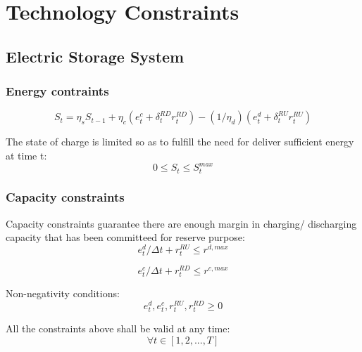 \section{Technology Constraints}

\subsection{Electric Storage System}
\subsubsection{Energy contraints}

\begin{equation}
\label{eq:state-ess}
S_t = \eta_s S_{t-1} + \eta_c (e_t^c+\delta^{RD}_t r^{RD}_t)  - (1/\eta_d) (e_t^d+\delta^{RU}_t r^{RU}_t)
\end{equation}

The state of charge is limited so as to fulfill the need for deliver sufficient energy at time t:
\begin{equation}
\label{eq:limit-state}
0 \leq S_t \leq S_t^{max} %
\end{equation}

\subsubsection{Capacity constraints}

Capacity constraints guarantee there are enough margin in charging/ discharging capacity that has been committeed for reserve purpose:
\begin{equation}
\label{eq:limit-discharge-rate}
e_t^d / \Delta t + r^{RU}_t \leq r^{d, max}
\end{equation}

\begin{equation}
\label{eq:limit-charge-rate}
e_t^c / \Delta t + r^{RD}_t \leq r^{c, max}
\end{equation}

Non-negativity conditions:
\begin{equation}
e_t^d, e_t^c, r_t^{RU}, r_t^{RD} \geq 0
\end{equation}

All the constraints above shall be valid at any time:
\begin{equation*}
\forall t \in [1, 2, ..., T]
\end{equation*}
